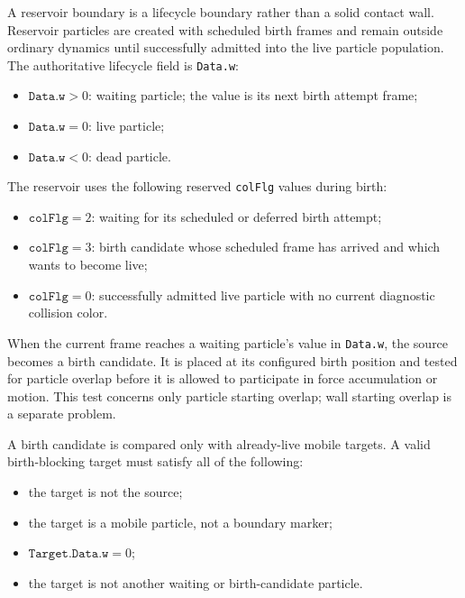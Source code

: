 A reservoir boundary is a lifecycle boundary rather than a solid contact
wall.  Reservoir particles are created with scheduled birth frames and remain
outside ordinary dynamics until successfully admitted into the live particle
population.  The authoritative lifecycle field is \texttt{Data.w}:

\begin{itemize}
    \item \(\texttt{Data.w}>0\): waiting particle; the value is its next birth
    attempt frame;
    \item \(\texttt{Data.w}=0\): live particle;
    \item \(\texttt{Data.w}<0\): dead particle.
\end{itemize}

The reservoir uses the following reserved \texttt{colFlg} values during birth:

\begin{itemize}
    \item \(\texttt{colFlg}=2\): waiting for its scheduled or deferred birth
    attempt;
    \item \(\texttt{colFlg}=3\): birth candidate whose scheduled frame has
    arrived and which wants to become live;
    \item \(\texttt{colFlg}=0\): successfully admitted live particle with no
    current diagnostic collision color.
\end{itemize}

When the current frame reaches a waiting particle's value in
\texttt{Data.w}, the source becomes a birth candidate.  It is placed at its
configured birth position and tested for particle overlap before it is allowed
to participate in force accumulation or motion.  This test concerns only
particle starting overlap; wall starting overlap is a separate problem.

A birth candidate is compared only with already-live mobile targets.  A valid
birth-blocking target must satisfy all of the following:

\begin{itemize}
    \item the target is not the source;
    \item the target is a mobile particle, not a boundary marker;
    \item \(\texttt{Target.Data.w}=0\);
    \item the target is not another waiting or birth-candidate particle.
\end{itemize}

